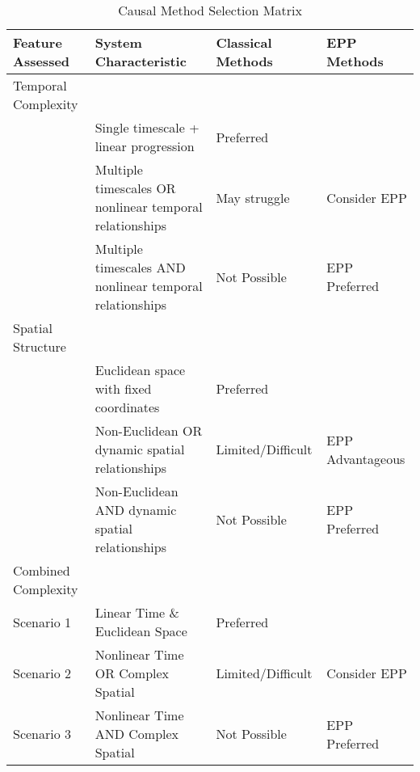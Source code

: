 \begin{table}[h!]
\begin{tabular}{llll}
Feature Assessed &
  System Characteristic &
  Classical Methods &
  EPP Methods \\ \hline
\multicolumn{1}{|l|}{Temporal Complexity} &
  \multicolumn{1}{l|}{} &
  \multicolumn{1}{l|}{} &
  \multicolumn{1}{l|}{} \\ \hline
\multicolumn{1}{|l|}{} &
  \multicolumn{1}{l|}{Single timescale + linear progression} &
  \multicolumn{1}{l|}{Preferred} &
  \multicolumn{1}{l|}{} \\ \hline
\multicolumn{1}{|l|}{} &
  \multicolumn{1}{l|}{Multiple timescales OR nonlinear temporal relationships} &
  \multicolumn{1}{l|}{May struggle} &
  \multicolumn{1}{l|}{Consider EPP} \\ \hline
\multicolumn{1}{|l|}{} &
  \multicolumn{1}{l|}{Multiple timescales AND nonlinear temporal relationships} &
  \multicolumn{1}{l|}{Not Possible} &
  \multicolumn{1}{l|}{EPP Preferred} \\ \hline
\multicolumn{1}{|l|}{Spatial Structure} &
  \multicolumn{1}{l|}{} &
  \multicolumn{1}{l|}{} &
  \multicolumn{1}{l|}{} \\ \hline
\multicolumn{1}{|l|}{} &
  \multicolumn{1}{l|}{Euclidean space with fixed coordinates} &
  \multicolumn{1}{l|}{Preferred} &
  \multicolumn{1}{l|}{} \\ \hline
\multicolumn{1}{|l|}{} &
  \multicolumn{1}{l|}{Non-Euclidean OR dynamic spatial relationships} &
  \multicolumn{1}{l|}{Limited/Difficult} &
  \multicolumn{1}{l|}{EPP Advantageous} \\ \hline
\multicolumn{1}{|l|}{} &
  \multicolumn{1}{l|}{Non-Euclidean AND dynamic spatial relationships} &
  \multicolumn{1}{l|}{Not Possible} &
  \multicolumn{1}{l|}{EPP Preferred} \\ \hline
\multicolumn{1}{|l|}{Combined Complexity} &
  \multicolumn{1}{l|}{} &
  \multicolumn{1}{l|}{} &
  \multicolumn{1}{l|}{} \\ \hline
\multicolumn{1}{|l|}{Scenario 1} &
  \multicolumn{1}{l|}{Linear Time \& Euclidean Space} &
  \multicolumn{1}{l|}{Preferred} &
  \multicolumn{1}{l|}{} \\ \hline
\multicolumn{1}{|l|}{Scenario 2} &
  \multicolumn{1}{l|}{Nonlinear Time OR Complex Spatial} &
  \multicolumn{1}{l|}{Limited/Difficult} &
  \multicolumn{1}{l|}{Consider EPP} \\ \hline
\multicolumn{1}{|l|}{Scenario 3} &
  \multicolumn{1}{l|}{Nonlinear Time AND Complex Spatial} &
  \multicolumn{1}{l|}{Not Possible} &
  \multicolumn{1}{l|}{EPP Preferred} \\ \hline
\end{tabular}
\caption{Causal Method Selection Matrix}
\label{tab:method_matrix}
\end{table}

